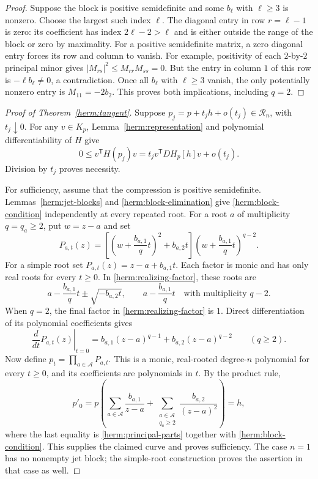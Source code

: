 \documentclass[reqno]{amsart}
\theoremstyle{definition}
\theoremstyle{remark}
\begin{document}
\begin{proof}
Suppose the block is positive semidefinite and some $b_\ell$ with
$\ell\geq3$ is nonzero.  Choose the largest such index $\ell$.
The diagonal entry in row $r=\ell-1$ is zero: its coefficient has index
$2\ell-2>\ell$ and is either outside the range of the block or zero by
maximality.  For a positive semidefinite matrix, a zero diagonal entry
forces its row and column to vanish.  For example, positivity of each
$2$-by-$2$ principal minor gives
$|M_{rs}|^2\leq M_{rr}M_{ss}=0$.  But the entry in column $1$ of this
row is $-\ell b_\ell\ne0$, a contradiction.  Once all $b_\ell$ with
$\ell\geq3$ vanish, the only potentially nonzero entry is
$M_{11}=-2b_2$.  This proves both implications, including $q=2$.
\end{proof}

\begin{proof}[Proof of Theorem~\ref{herm:tangent}]
Suppose $p_j=p+t_jh+o(t_j)\in\mathcal R_n$, with $t_j\downarrow0$.
For any $v\in K_p$, Lemma~\ref{herm:representation} and polynomial
differentiability of $H$ give
\[
 0\leq v^{\mathsf T}H(p_j)v
       =t_jv^{\mathsf T}DH_p[h]v+o(t_j).
\]
Division by $t_j$ proves necessity.

For sufficiency, assume that the compression is positive semidefinite.
Lemmas~\ref{herm:jet-blocks} and \ref{herm:block-elimination} give
\eqref{herm:block-condition} independently at every repeated root.
For a root $a$ of multiplicity $q=q_a\geq2$, put $w=z-a$ and set
\begin{equation}
 P_{a,t}(z)=
 \left[\left(w+\frac{b_{a,1}}{q}t\right)^2+b_{a,2}t\right]
 \left(w+\frac{b_{a,1}}{q}t\right)^{q-2}.
 \label{herm:realizing-factor}
\end{equation}
For a simple root set $P_{a,t}(z)=z-a+b_{a,1}t$.  Each factor is monic
and has only real roots for every $t\geq0$.  In
\eqref{herm:realizing-factor}, these roots are
\[
 a-\frac{b_{a,1}}{q}t\pm\sqrt{-b_{a,2}t},
 \qquad
 a-\frac{b_{a,1}}{q}t
       \quad\text{with multiplicity }q-2.
\]
When $q=2$, the final factor in \eqref{herm:realizing-factor} is $1$.
Direct differentiation of its polynomial coefficients gives
\[
 \left.\frac{d}{dt}P_{a,t}(z)\right|_{t=0}
       =b_{a,1}(z-a)^{q-1}+b_{a,2}(z-a)^{q-2}
       \qquad(q\geq2).
\]
Now define $p_t=\prod_{a\in\mathcal A}P_{a,t}$.  This is a monic,
real-rooted degree-$n$ polynomial for every $t\geq0$, and its
coefficients are polynomials in $t$.  By the product rule,
\[
 p'_0=p\left(
       \sum_{a\in\mathcal A}\frac{b_{a,1}}{z-a}
       +\sum_{\substack{a\in\mathcal A\\q_a\geq2}}
                       \frac{b_{a,2}}{(z-a)^2}\right)=h,
\]
where the last equality is \eqref{herm:principal-parts} together with
\eqref{herm:block-condition}.  This supplies the claimed curve and
proves sufficiency.  The case $n=1$ has no nonempty jet block; the
simple-root construction proves the assertion in that case as well.
\end{proof}
\end{document}

